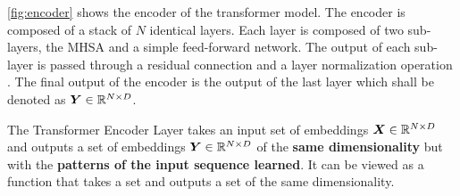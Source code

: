 \documentclass[../../main.tex]{subfiles}
\begin{document}
\autoref{fig:encoder} shows the encoder of the transformer model. The encoder is composed of a stack of $N$ identical layers. Each layer is composed of two sub-layers, the MHSA and a simple feed-forward network. The output of each sub-layer is passed through a residual connection and a layer normalization operation \cite{ba2016layer}. The final output of the encoder is the output of the last layer which shall be denoted as $\bm{Y} \in \mathbb{R}^{N \times D}$. 

\begin{note}

The Transformer Encoder Layer takes an input set of embeddings $\bm{X} \in \mathbb{R}^{N \times D}$ and outputs a set of embeddings $\bm{Y} \in \mathbb{R}^{N \times D}$ of the \textbf{same dimensionality} but with the \textbf{patterns of the input sequence learned}. It can be viewed as a function that takes a set and outputs a set of the same dimensionality.

\end{note}

\ifSubfilesClassLoaded{%
    \printbibliography{}
}{} 
\end{document}
